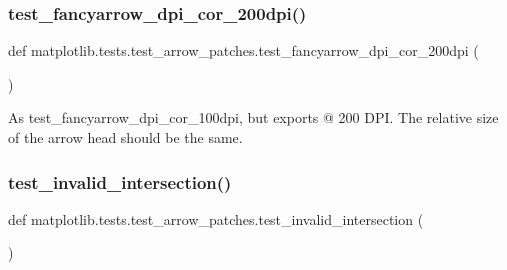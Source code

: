 \subsubsection{\texorpdfstring{test\+\_\+fancyarrow\+\_\+dpi\+\_\+cor\+\_\+200dpi()}{test\_fancyarrow\_dpi\_cor\_200dpi()}}
{\footnotesize\ttfamily def matplotlib.\+tests.\+test\+\_\+arrow\+\_\+patches.\+test\+\_\+fancyarrow\+\_\+dpi\+\_\+cor\+\_\+200dpi (\begin{DoxyParamCaption}{ }\end{DoxyParamCaption})}

\begin{DoxyVerb}As test_fancyarrow_dpi_cor_100dpi, but exports @ 200 DPI. The relative size
of the arrow head should be the same.
\end{DoxyVerb}
 \mbox{\label{namespacematplotlib_1_1tests_1_1test__arrow__patches_a9e3d0191323c351df500cdce2e141fdc}} 
\subsubsection{\texorpdfstring{test\+\_\+invalid\+\_\+intersection()}{test\_invalid\_intersection()}}
{\footnotesize\ttfamily def matplotlib.\+tests.\+test\+\_\+arrow\+\_\+patches.\+test\+\_\+invalid\+\_\+intersection (\begin{DoxyParamCaption}{ }\end{DoxyParamCaption})}

